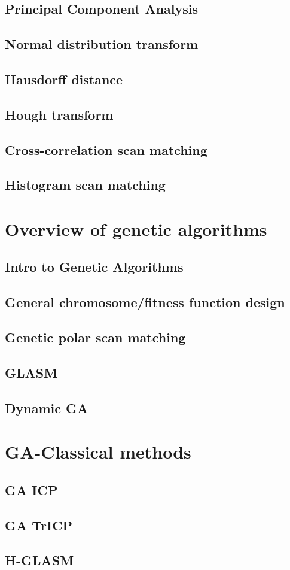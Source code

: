 \documentclass[authoryearcitations]{UoYCSproject}
\begin{document}
\subsection{Principal Component Analysis}
\subsection{Normal distribution transform}
\subsection{Hausdorff distance}
\subsection{Hough transform}
\subsection{Cross-correlation scan matching}
\subsection{Histogram scan matching}

\section{Overview of genetic algorithms}
\subsection{Intro to Genetic Algorithms}
\subsection{General chromosome/fitness function design}
\subsection{Genetic polar scan matching}
\subsection{GLASM}
\subsection{Dynamic GA}

\section{GA-Classical methods}
\subsection{GA ICP}
\subsection{GA TrICP}
\subsection{H-GLASM}
\cleardoublepage



\end{document}
